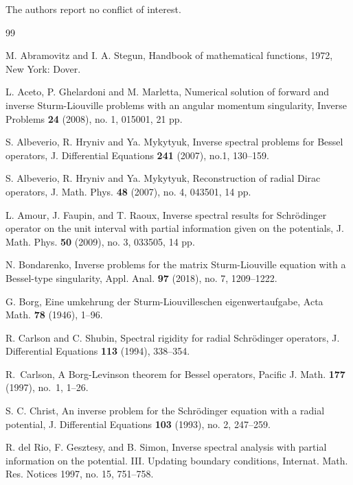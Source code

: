 \documentclass[reqno,12pt,centertags]{amsart}
\numberwithin{equation}{section}
\theoremstyle{definition}
\begin{document}
\vskip 0.5cm
The authors report no conflict of interest. 


\begin{thebibliography}{99}
\setlength{\itemsep}{0pt} %
\setlength{\parskip}{0pt} %

M. Abramovitz  and I. A. Stegun,  
Handbook of mathematical functions,
1972, New York: Dover.

L. Aceto, P. Ghelardoni and M. Marletta,
Numerical solution of forward and inverse Sturm-Liouville problems with an angular momentum singularity,
Inverse Problems \textbf{24} (2008), no. 1, 015001, 21 pp.

S. Albeverio, R. Hryniv and Ya. Mykytyuk,
Inverse spectral problems for Bessel operators,
J. Differential Equations \textbf{241} (2007), no.1, 130--159.

S. Albeverio, R. Hryniv and Ya. Mykytyuk,
Reconstruction of radial Dirac operators,
J. Math. Phys. \textbf{48} (2007), no. 4, 043501, 14 pp.

L. Amour, J. Faupin, and T. Raoux, 
Inverse spectral results for Schr\"{o}dinger operator on the unit interval with partial information given on the potentials,
J. Math. Phys. \textbf{50} (2009), no. 3, 033505, 14 pp.

N. Bondarenko, 
Inverse problems for the matrix Sturm-Liouville equation with a Bessel-type singularity,
Appl. Anal. \textbf{97} (2018), no. 7, 1209--1222.


G. Borg, Eine umkehrung der Sturm-Liouvilleschen eigenwertaufgabe, 
Acta Math. \textbf{78} (1946), 1--96.


R. Carlson and C. Shubin, 
Spectral rigidity for radial Schr\"{o}dinger operators, 
J. Differential Equations \textbf{113} (1994), 338--354.


R.~Carlson, 
A Borg-Levinson theorem for Bessel operators, 
Pacific J. Math. \textbf{177} (1997), no.~1, 1--26.

S. C. Christ, 
An inverse problem for the Schr\"{o}dinger equation with a radial potential, 
J. Differential Equations \textbf{103} (1993), no. 2, 247--259.


R. del Rio, F. Gesztesy, and B. Simon, 
Inverse spectral analysis with partial information on the potential. III. Updating boundary conditions, 
Internat. Math. Res. Notices 1997, no. 15, 751--758.


\end{thebibliography}
\end{document}
